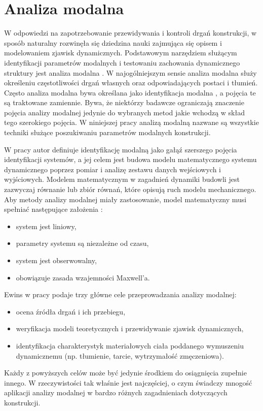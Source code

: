 \section{Analiza modalna} \label{section: modalAnalysisIntro}
W odpowiedzi na zapotrzebowanie przewidywania i kontroli drgań konstrukcji, w sposób naturalny rozwinęła się dziedzina nauki zajmująca się opisem i modelowaniem zjawisk dynamicznych. Podstawowym narzędziem służącym identyfikacji parametrów modalnych i testowaniu zachowania dynamicznego struktury jest analiza modalna . W najogólniejszym sensie analiza modalna służy określeniu częstotliwości drgań własnych oraz odpowiadających postaci i tłumień. Często analiza modalna bywa określana jako identyfikacja modalna , a pojęcia te są traktowane zamiennie. Bywa, że niektórzy badawcze ograniczają znaczenie pojęcia analizy modalnej jedynie do wybranych metod jakie wchodzą w skład tego szerokiego pojęcia. W niniejszej pracy analizą modalną nazwane są wszystkie techniki służące poszukiwaniu parametrów modalnych konstrukcji.

W pracy \parencite{Zhang2004} autor definiuje identyfikację modalną jako gałąź szerszego pojęcia identyfikacji systemów, a jej celem jest budowa modelu matematycznego systemu dynamicznego poprzez pomiar i analizę zestawu danych wejściowych i wyjściowych. Modelem matematycznym w zagadnień dynamiki budowli jest zazwyczaj równanie lub zbiór równań, które opisują ruch modelu mechanicznego. Aby metody analizy modalnej miały zastosowanie, model matematyczny musi spełniać następujące założenia \parencite{Maia1997}:
\begin{itemize}
	\item system jest liniowy,
	\item parametry systemu są niezależne od czasu,
	\item system jest obserwowalny,
	\item obowiązuje zasada wzajemności Maxwell'a.
\end{itemize}

Ewins w  pracy \cite{Ewins2000} podaje trzy główne cele przeprowadzania analizy modalnej:
\begin{itemize}
	\item ocena źródła drgań i ich przebiegu,
	\item weryfikacja modeli teoretycznych i przewidywanie zjawisk dynamicznych,
	\item identyfikacja charakterystyk materiałowych ciała poddanego wymuszeniu dynamicznemu (np. tłumienie, tarcie, wytrzymałość zmęczeniowa). 
\end{itemize}
Każdy z powyższych celów może być jedynie środkiem do osiągnięcia zupełnie innego. W rzeczywistości tak właśnie jest najczęściej, o czym świadczy mnogość aplikacji analizy modalnej w bardzo różnych zagadnieniach dotyczących konstrukcji. 


